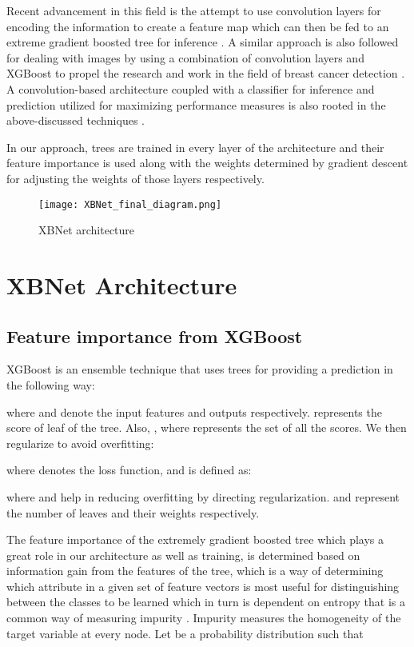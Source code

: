 \documentclass[review]{elsarticle}
\begin{document}
Recent advancement in this field is the attempt to use convolution layers for encoding the information to create a feature map which can then be fed to an extreme gradient boosted tree for inference \cite{thongsuwan2021convxgb}. A similar approach is also followed for dealing with images by using a combination of convolution layers and XGBoost to propel the research and work in the field of breast cancer detection \cite{sugiharti2021convolutional}. A convolution-based architecture coupled with a classifier for inference and prediction utilized for maximizing performance measures is also rooted in the above-discussed techniques \cite{geng2016learning}. 

In our approach, trees are trained in every layer of the architecture and their feature importance is used along with the weights determined by gradient descent for adjusting the weights of those layers respectively.


\begin{figure*}[t!]
\centerline{\texttt{[image: XBNet\_final\_diagram.png]}}
\caption{XBNet architecture}    
  \label{fig:sample_image}
\end{figure*}

\section{XBNet Architecture}

\subsection{Feature importance from XGBoost}
XGBoost is an ensemble technique that uses  trees for providing a prediction in the following way:

where  and  denote the input features and outputs respectively.  represents the score of leaf of the  tree. Also,  , where  represents the set of all the scores. We then regularize to avoid overfitting:

where  denotes the loss function, and  is defined as:

 where  and  help in reducing overfitting by directing regularization.  and   represent the number of leaves and their weights respectively.

The feature importance of the extremely gradient boosted tree which plays a great role in our architecture as well as training, is determined based on information gain from the features of the tree, which is a way of determining which attribute in a given set of feature vectors is most useful for distinguishing between the classes to be learned which in turn is dependent on entropy that is a common way of measuring impurity \cite{raileanu2004theoretical} \cite{li2006spatial}. Impurity measures the homogeneity of the target variable at every node.
Let  be a probability distribution such that
\end{document}

